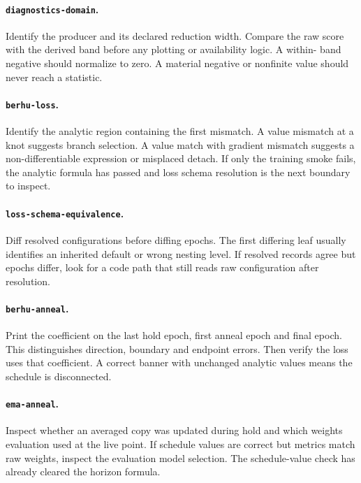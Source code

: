 \documentclass[10pt,aps,prd,twocolumn,nofootinbib]{revtex4-2}
\newcommand{\code}[1]{\texttt{#1}}
\begin{document}
\paragraph{\code{diagnostics-domain}.}
Identify the producer and its declared reduction width.  Compare the raw score
with the derived band before any plotting or availability logic.  A within-
band negative should normalize to zero.  A material negative or nonfinite
value should never reach a statistic.

\paragraph{\code{berhu-loss}.}
Identify the analytic region containing the first mismatch.  A value mismatch
at a knot suggests branch selection.  A value match with gradient mismatch
suggests a non-differentiable expression or misplaced detach.  If only the
training smoke fails, the analytic formula has passed and loss schema
resolution is the next boundary to inspect.

\paragraph{\code{loss-schema-equivalence}.}
Diff resolved configurations before diffing epochs.  The first differing leaf
usually identifies an inherited default or wrong nesting level.  If resolved
records agree but epochs differ, look for a code path that still reads raw
configuration after resolution.

\paragraph{\code{berhu-anneal}.}
Print the coefficient on the last hold epoch, first anneal epoch and final
epoch.  This distinguishes direction, boundary and endpoint errors.  Then
verify the loss uses that coefficient.  A correct banner with unchanged
analytic values means the schedule is disconnected.

\paragraph{\code{ema-anneal}.}
Inspect whether an averaged copy was updated during hold and which weights
evaluation used at the live point.  If schedule values are correct but metrics
match raw weights, inspect the evaluation model selection.  The schedule-value
check has already cleared the horizon formula.
\end{document}
